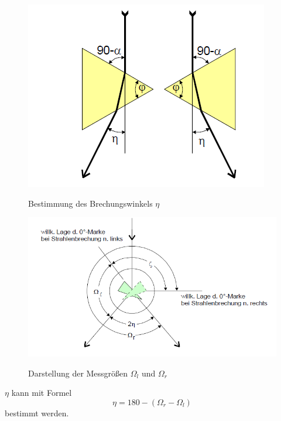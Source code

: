 \begin{figure}[H]
\centering
\includegraphics[width=\textwidth]{4.png}
\caption{Bestimmung des Brechungswinkels $\eta$}\cite{anleitung}
\label{fig:4}
\end{figure}

\begin{figure}[H]
\centering
\includegraphics[width=\textwidth]{5.png}
\caption{Darstellung der Messgrößen $\Omega_l$ und $\Omega_r$}\cite{anleitung}
\label{fig:5}
\end{figure}
$\eta$ kann mit Formel
\begin{equation}
  \eta = 180 - (\Omega_r-\Omega_l)
\end{equation}
bestimmt werden.
